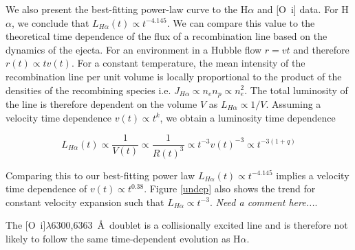\documentclass[useAMS,usenatbib,usegraphicx]{mnras}
\begin{document}
We also present the best-fitting power-law curve to the H$\alpha$ and [O~{\sc i}] data.  For H$\alpha$, we conclude that $L_{H\alpha}(t) \propto t^{-4.145}$.  We can compare this value to the theoretical time dependence of the flux of a recombination line based on the dynamics of the ejecta.  For an environment in a Hubble flow $r=vt$ and therefore $r(t) \propto tv(t)$.  For a constant temperature, the mean intensity of the recombination line per unit volume is locally proportional to the product of the densities of the recombining species i.e. $J_{H\alpha} \propto n_e n_p \propto n_e^2$.  The total luminosity of the line is therefore dependent on the volume $V$ as $L_{H\alpha} \propto 1/V $.  Assuming a velocity time dependence $v(t) \propto t^k$, we obtain a luminosity time dependence 

\begin{equation}
L_{H\alpha}(t) \propto \frac{1}{V(t)} \propto \frac{1}{R(t)^3} \propto t^{-3}v(t)^{-3} \propto t^{-3(1+q)}
\end{equation}

Comparing this to our best-fitting power law $L_{H\alpha}(t) \propto t^{-4.145}$ implies a velocity time dependence of $v(t) \propto t^{0.38}$.  Figure \ref{undep} also shows the trend for  constant velocity expansion such that $L_{H\alpha} \propto t^{-3}$.  \textit{Need a comment here...}.

The [O~{\sc i}]$\lambda$6300,6363~\AA\ doublet is a collisionally excited line and is therefore not likely to follow the same time-dependent evolution as H$\alpha$.
\end{document}

